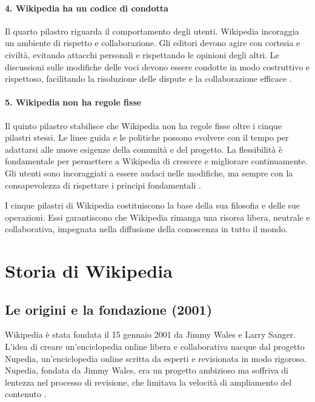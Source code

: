 \documentclass[12pt,a4paper]{report}
\begin{document}
\paragraph*{4. Wikipedia ha un codice di condotta}
Il quarto pilastro riguarda il comportamento degli utenti. Wikipedia incoraggia un ambiente di rispetto e collaborazione. Gli editori devono agire con cortesia e civiltà, evitando attacchi personali e rispettando le opinioni degli altri. Le discussioni sulle modifiche delle voci devono essere condotte in modo costruttivo e rispettoso, facilitando la risoluzione delle dispute e la collaborazione efficace \cite{history_of_wikis}.

\paragraph*{5. Wikipedia non ha regole fisse}
Il quinto pilastro stabilisce che Wikipedia non ha regole fisse oltre i cinque pilastri stessi. Le linee guida e le politiche possono evolvere con il tempo per adattarsi alle nuove esigenze della comunità e del progetto. La flessibilità è fondamentale per permettere a Wikipedia di crescere e migliorare continuamente. Gli utenti sono incoraggiati a essere audaci nelle modifiche, ma sempre con la consapevolezza di rispettare i principi fondamentali \cite{reagle2010good}.

I cinque pilastri di Wikipedia costituiscono la base della sua filosofia e delle sue operazioni. Essi garantiscono che Wikipedia rimanga una risorsa libera, neutrale e collaborativa, impegnata nella diffusione della conoscenza in tutto il mondo.

\section{Storia di Wikipedia}

\subsection{Le origini e la fondazione (2001)}

Wikipedia è stata fondata il 15 gennaio 2001 da Jimmy Wales e Larry Sanger. L'idea di creare un'enciclopedia online libera e collaborativa nacque dal progetto Nupedia, un'enciclopedia online scritta da esperti e revisionata in modo rigoroso. Nupedia, fondata da Jimmy Wales, era un progetto ambizioso ma soffriva di lentezza nel processo di revisione, che limitava la velocità di ampliamento del contenuto \cite{lih2009wikipedia}.
\end{document}
